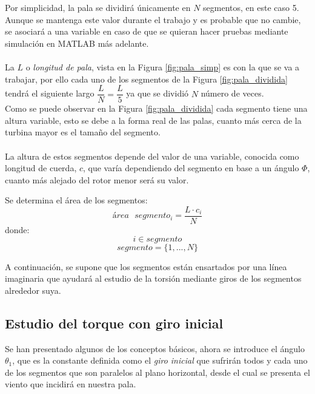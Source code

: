 Por simplicidad, la pala se dividirá únicamente en $N$ segmentos, en este caso 5. Aunque se mantenga este valor durante el trabajo y es probable que no cambie, se asociará a una variable en caso de que se quieran hacer pruebas mediante simulación en MATLAB más adelante. \\\\
    

La $L$ o \textit{longitud de pala}, vista en la Figura \ref{fig:pala_simp} es con la que se va a trabajar, por ello cada uno de los segmentos de la Figura \ref{fig:pala_dividida} tendrá el siguiente largo $\dfrac{L}{N} = \dfrac{L}{5}$ ya que se dividió $N$ número de veces. \\


Como se puede observar en la Figura \ref{fig:pala_dividida} cada segmento tiene una altura variable, esto se debe a la forma real de las palas, cuanto más cerca de la turbina mayor es el tamaño del segmento. \\\\

La altura de estos segmentos depende del valor de una variable, conocida como longitud de cuerda, $c$, que varía dependiendo del segmento en base a un ángulo $\varPhi$, cuanto más alejado del rotor menor será su valor. \\


\begin{definicion}
Se determina el área de los segmentos:
$$ área \text{ } segmento_{i} = \dfrac{L \cdot c_i}{N} $$
donde:
$$ i \in segmento $$
$$ segmento = \{1, ..., N\}$$
\end{definicion}

A continuación, se supone que los segmentos están ensartados por una línea imaginaria que ayudará al estudio de la torsión mediante giros de los segmentos alrededor suya.


\subsection{Estudio del torque con giro inicial}
\label{section:torque_giro_inicial}

Se han presentado algunos de los conceptos básicos, ahora se introduce el ángulo $ \theta_1 $, que es la constante definida como el \textit{giro inicial} que sufrirán todos y cada uno de los segmentos que son paralelos al plano horizontal, desde el cual se presenta el viento que incidirá en nuestra pala.\\

